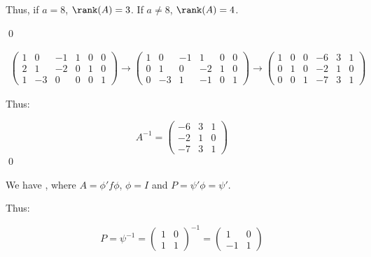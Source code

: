 \documentclass[12pt]{article}
\begin{document}

\begin{correction}
    Thus, if $a = 8$, $\rank(A) = 3$. If $a \ne 8$, $\rank(A) = 4$.
\end{correction}
\qed



\begin{equation}
    \begin{split}
        \left( \begin{array}{ccc|ccc}
            1 & 0  & -1 & 1 & 0 & 0 \\
            2 & 1  & -2 & 0 & 1 & 0 \\
            1 & -3 & 0  & 0 & 0 & 1
        \end{array} \right)
        \to
        \left( \begin{array}{ccc|ccc}
            1 & 0  & -1 & 1  & 0 & 0 \\
            0 & 1  & 0  & -2 & 1 & 0 \\
            0 & -3 & 1  & -1 & 0 & 1
        \end{array} \right)
        \to
        \left( \begin{array}{ccc|ccc}
            1 & 0 & 0 & -6 & 3 & 1 \\
            0 & 1 & 0 & -2 & 1 & 0 \\
            0 & 0 & 1 & -7 & 3 & 1
        \end{array} \right)
    \end{split}
\end{equation}

Thus:

\begin{equation}
    A^{-1} =
    \begin{pmatrix}
        -6 & 3 & 1 \\
        -2 & 1 & 0 \\
        -7 & 3 & 1
    \end{pmatrix}
\end{equation}
\qed


We have , where $A = \phi' f \phi$, $\phi = I$ and $P = \psi' \phi = \psi'$.

Thus:

\begin{equation}
    P = \psi^{-1} =
    \begin{pmatrix}
        1 & 0 \\
        1 & 1
    \end{pmatrix}^{-1}
    =
    \begin{pmatrix}
        1  & 0 \\
        -1 & 1
    \end{pmatrix}
\end{equation}
\end{document}
